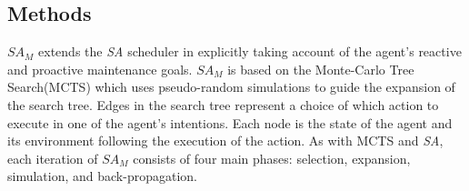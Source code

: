 \documentclass[a0,landscape]{a0poster}
\newcommand{\SA}{\emph{SA}\xspace}
\newcommand{\SAM}{\emph{$SA_M$}\xspace}
\begin{document}
\begin{multicols}{4}
%


\color{DarkSlateGray} %




\section*{Methods}

\SAM extends the \SA scheduler \cite{Yao/Logan:16a} in explicitly taking account of the agent's reactive and proactive maintenance goals.
%
\SAM is based on the Monte-Carlo Tree Search(MCTS) which uses pseudo-random simulations to guide the expansion of the search tree.
Edges in the search tree represent a choice of which action to execute in one of the agent's intentions.
Each node is the state of the agent and its environment following the execution of the action.
%
As with MCTS and \SA, each iteration of \SAM consists of four main phases: selection, expansion, simulation, and back-propagation.


\end{multicols}
\end{document}
